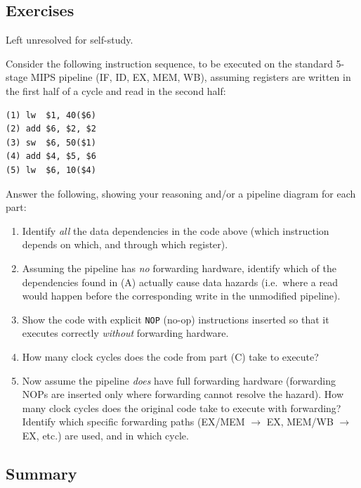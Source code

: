 \subsection{Exercises}

Left unresolved for self-study.

\begin{exercise}
Consider the following instruction sequence, to be executed on the standard
5-stage MIPS pipeline (IF, ID, EX, MEM, WB), assuming registers are written
in the first half of a cycle and read in the second half:

\begin{lstlisting}
(1) lw  $1, 40($6)
(2) add $6, $2, $2
(3) sw  $6, 50($1)
(4) add $4, $5, $6
(5) lw  $6, 10($4)
\end{lstlisting}

Answer the following, showing your reasoning and/or a pipeline diagram for
each part:

\begin{enumerate}[label=(\Alph*)]
  \item Identify \emph{all} the data dependencies in the code above (which
  instruction depends on which, and through which register).
  \item Assuming the pipeline has \emph{no} forwarding hardware, identify
  which of the dependencies found in (A) actually cause data hazards
  (i.e.\ where a read would happen before the corresponding write in the
  unmodified pipeline).
  \item Show the code with explicit \texttt{NOP} (no-op) instructions
  inserted so that it executes correctly \emph{without} forwarding
  hardware.
  \item How many clock cycles does the code from part (C) take to execute?
  \item Now assume the pipeline \emph{does} have full forwarding hardware
  (forwarding NOPs are inserted only where forwarding cannot resolve the
  hazard). How many clock cycles does the original code take to execute
  with forwarding? Identify which specific forwarding paths (EX/MEM
  $\to$ EX, MEM/WB $\to$ EX, etc.) are used, and in which cycle.
\end{enumerate}
\end{exercise}

\subsection{Summary}

